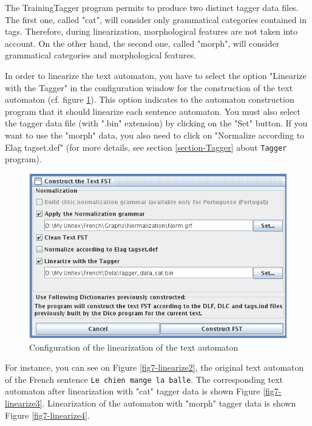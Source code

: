 \bigskip
\noindent The TrainingTagger program permits to produce two distinct tagger data files. The first one, called "cat", will consider only 
grammatical categories contained in tags. Therefore, during linearization, morphological features are not taken into account. 
On the other hand, the second one, called "morph", will consider grammatical categories and morphological features.

\bigskip
\noindent In order to linearize the text automaton, you have to select the option "Linearize with the Tagger" 
in the configuration window for the construction of the text automaton (cf. figure \ref{fig7-linearize1}). 
This option indicates to the automaton construction program that it should linearize each sentence automaton. 
You must also select the tagger data file (with ".bin" extension) by clicking on the "Set" button.
If you want to use the "morph" data, you also need to click on "Normalize according to Elag tagset.def" (for more
details, see section \ref{section-Tagger} about \verb+Tagger+ program).

\begin{figure}[!ht]
\begin{center}
\includegraphics[width=13cm]{resources/img/fig7-linearize1.png}
\caption{Configuration of the linearization of the text automaton\label{fig7-linearize1}}
\end{center}
\end{figure}

For instance, you can see on Figure \ref{fig7-linearize2}, the original text automaton of the French sentence 
\verb+Le chien mange la balle+. The corresponding text automaton after linearization with "cat" tagger data is 
shown Figure \ref{fig7-linearize3}. Linearization of the automaton with "morph" tagger data is shown Figure 
\ref{fig7-linearize4}.

